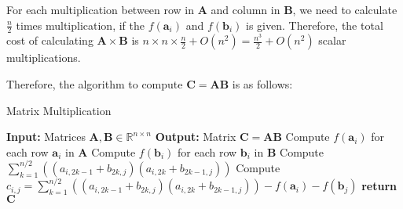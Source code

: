 \documentclass{article}
\newcommand{\R}{\mathbb{R}}
\begin{document}
\noindent
For each multiplication between row in \(\bm{A}\) and column in \(\bm{B}\), we need to calculate \(\frac{n}{2}\) times multiplication, if the \(f(\bm{a}_i)\) and \( f(\bm{b}_i)\) is given. Therefore, the total cost of calculating \(\bm{A} \times \bm{B}\) is \(n \times n \times \frac{n}{2} + O(n^2) = \frac{n^3}{2} + O(n^2)\) scalar multiplications.

\noindent
Therefore, the algorithm to compute \(\bm{C} = \bm{A}\bm{B}\) is as follows:

\noindent
\begin{algorithm}
    \caption{Matrix Multiplication}
    \begin{algorithmic}[1]
        \State \textbf{Input:} Matrices \(\bm{A}, \bm{B} \in \R^{n \times n}\)
        \State \textbf{Output:} Matrix \(\bm{C} = \bm{A} \bm{B}\)
        \State Compute \(f(\bm{a}_i)\) for each row \(\bm{a}_i\) in \(\bm{A}\)
        \State Compute \(f(\bm{b}_i)\) for each row \(\bm{b}_i\) in \(\bm{B}\)
                \State Compute \(\sum_{k = 1}^{n / 2}((a_{i, 2k - 1} + b_{2k, j})(a_{i, 2k} + b_{2k - 1, j}))\)
                \State Compute \(c_{i, j} = \sum_{k = 1}^{n / 2}((a_{i, 2k - 1} + b_{2k, j})(a_{i, 2k} + b_{2k - 1, j})) - f(\bm{a}_i) - f(\bm{b}_j)\)
            \EndFor
        \EndFor
        \State \textbf{return} \(\bm{C}\)
    \end{algorithmic}
\end{algorithm}
\end{document}

